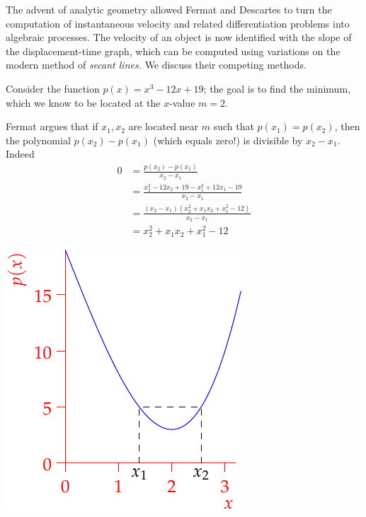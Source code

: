 
The advent of analytic geometry allowed Fermat and Descartes to turn the computation of instantaneous velocity and related differentiation problems into algebraic processes. The velocity of an object is now identified with the slope of the displacement-time graph, which can be computed using variations on the modern method of \emph{secant lines.} We discuss their competing methods.

\begin{minipage}[t]{0.63\linewidth}\vspace{0pt}
	
	Consider the function $p(x)=x^3-12x+19$; the goal is to find the minimum, which we know to be located at the $x$-value $m=2$.\par
	Fermat argues that if $x_1,x_2$ are located near $m$ such that $p(x_1)=p(x_2)$, then the polynomial $p(x_2)-p(x_1)$ (which equals zero!) is divisible by $x_2-x_1$. Indeed
	\begin{align*}
		0&=\frac{p(x_2)-p(x_1)}{x_2-x_1}\\
		&=\frac{x_2^3-12x_2+19-x_1^3+12x_1-19}{x_2-x_1}\\
		&=\frac{(x_2-x_1)(x_2^2+x_1x_2+x_1^2-12)}{x_2-x_1}\\
		&=x_2^2+x_1x_2+x_1^2-12
	\end{align*}
\end{minipage}
\hfill
\begin{minipage}[t]{0.35\linewidth}\vspace{0pt}
	\flushright\includegraphics{analytic-adequation}
\end{minipage}\medbreak

